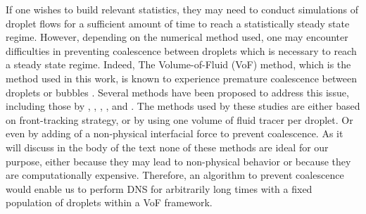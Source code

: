
If one wishes to build relevant statistics, they may need to conduct simulations of droplet flows for a sufficient amount of time to reach a statistically steady state regime. 
However, depending on the numerical method used, one may encounter difficulties in preventing coalescence between droplets which is necessary to reach a steady state regime. 
Indeed, The Volume-of-Fluid (VoF) method, which is the method used in this work, is known to experience premature coalescence between droplets or bubbles \citep{innocenti2020direct}.
Several methods have been proposed to address this issue, including those by \citet{roghair2011drag}, \citet{hidman2023assessing}, \citet{balcazar2015multiple}, \citet{zhang2023evolution}, and \citet{karnakov2022computing}. 
The methods used by these studies are either based on front-tracking strategy, or by using one volume of fluid tracer per droplet.
Or even by adding of a non-physical interfacial force to prevent coalescence. 
As it will discuss in the body of the text none of these methods are ideal for our purpose, either because they may lead to non-physical behavior or because they are computationally expensive. 
Therefore, an algorithm to prevent coalescence would enable us to perform DNS for arbitrarily long times with a fixed population of droplets within a VoF framework.


